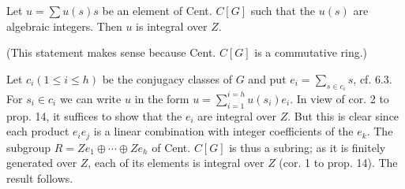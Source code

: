 Let $u = \sum u(s)s$ be an element of Cent. $C[G]$ such that the $u(s)$ are algebraic integers. Then $u$ is integral over $Z$.

(This statement makes sense because Cent. $C[G]$ is a commutative ring.)

Let $c_i (1 \leqslant i \leqslant h)$ be the conjugacy classes of $G$ and put $e_i = \sum_{s \in c_i} s$, cf. 6.3. For $s_i \in c_i$ we can write $u$ in the form $u = \sum_{i=1}^{i=h} u(s_i)e_i$. In view of cor. 2 to prop. 14, it suffices to show that the $e_i$ are integral over $Z$. But this is clear since each product $e_i e_j$ is a linear combination with integer coefficients of the $e_k$. The subgroup $R = Ze_1 \oplus \cdots \oplus Ze_h$ of Cent. $C[G]$ is thus a subring; as it is finitely generated over $Z$, each of its elements is integral over $Z$ (cor. 1 to prop. 14). The result follows.
